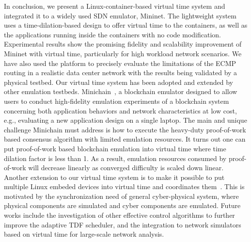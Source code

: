 \label{VT:Sec:Conclusion}

In conclusion, we present a Linux-container-based virtual time system and integrated it to a widely used SDN emulator, Mininet.
The lightweight system uses a time-dilation-based design to offer virtual time to the containers,
as well as the applications running inside the containers with no code modification.
Experimental results show the promising fidelity and scalability improvement of Mininet with virtual time,
particularly for high workload network scenarios. We have also used the platform to precisely
evaluate the limitations of the ECMP routing in a realistic data center network with the results being validated by a physical testbed.
Our virtual time system has been adopted and extended by other emulation testbeds.
Minichain~\cite{Minichain}, a blockchain emulator designed to allow users to conduct
high-fidelity emulation experiments of a blockchain system concerning both application behaviors
and network characteristics at low cost, e.g., evaluating a new application design on a single laptop.
The main and unique challenge Minichain must address is how to execute
the heavy-duty proof-of-work based consensus algorithm with limited emulation resources.
It turns out one can put proof-of-work based blockchain emulation into virtual time where time dilation factor is less than 1.
As a result, emulation resources consumed by proof-of-work will decrease linearly as converged difficulty is scaled down linear.
Another extension to our virtual time system is to make it possible to put
multiple Linux embeded devices into virtual time and coordinates them~\cite{DistributedVT}.
This is motivated by the synchronization need of general cyber-physical system,
where physical components are simulated and cyber components are emulated.
Future works include the investigation of other effective control algorithms to further improve the adaptive TDF scheduler,
and the integration to network simulators based on virtual time for large-scale network analysis.

